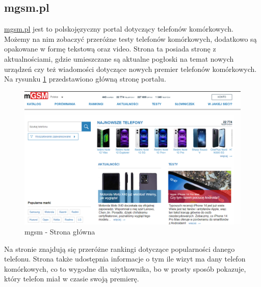 \subsection{mgsm.pl}
\href{https://www.mgsm.pl/pl/}{mgsm.pl} \cite{mgsm} jest to polskojęzyczny portal dotyczący telefonów komórkowych. Możemy na nim zobaczyć przeróżne testy telefonów komórkowych, dodatkowo są opakowane w formę tekstową oraz video. Strona ta posiada stronę z aktualnościami, gdzie umieszczane są aktualne pogłoski na temat nowych urządzeń czy też wiadomości dotyczące nowych premier telefonów komórkowych. Na rysunku \ref*{mgsm_1} przedstawiono główną stronę portalu.
\begin{figure}[H]
    \centering
    \includegraphics[scale=0.45]{img/mgsm/mgsm.png}
    \caption{mgsm - Strona główna}
    \label{mgsm_1}
\end{figure}
Na stronie znajdują się przeróżne rankingi dotyczące popularności danego telefonu. Strona także udostępnia informacje o tym ile wizyt ma dany telefon komórkowych, co to wygodne dla użytkownika, bo w prosty sposób pokazuje, który telefon miał w czasie swoją premierę.

